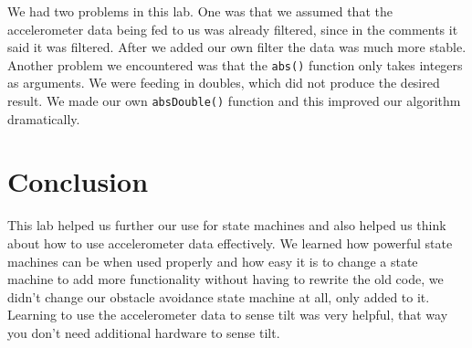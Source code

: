 \documentclass[10pt,titlepage]{article}
\begin{document}
    We had two problems in this lab. One was that we assumed that the accelerometer data being fed to us was already filtered, since in the comments it said it was filtered. After we added our own filter the data was much more stable. Another problem we encountered was that the \texttt{abs()} function only takes integers as arguments. We were feeding in doubles, which did not produce the desired result. We made our own \texttt{absDouble()} function and this improved our algorithm dramatically.

  \section{Conclusion}
    This lab helped us further our use for state machines and also helped us think about how to use accelerometer data effectively. We learned how powerful state machines can be when used properly and how easy it is to change a state machine to add more functionality without having to rewrite the old code, we didn't change our obstacle avoidance state machine at all, only added to it. Learning to use the accelerometer data to sense tilt was very helpful, that way you don't need additional hardware to sense tilt.
\end{document}
